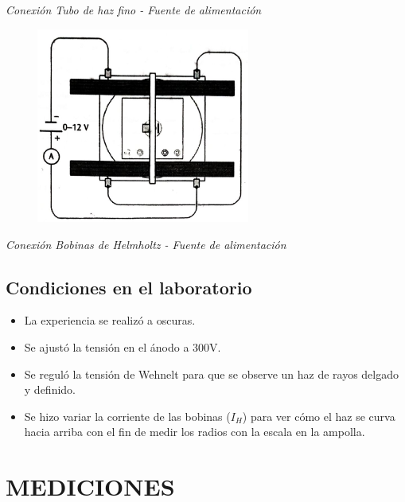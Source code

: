 \documentclass[a4paper]{article}
\begin{document}
        \begin{center}
            \textit{Conexión Tubo de haz fino - Fuente de alimentación} \\
        \end{center}

        \begin{figure}[h!]
            \centering
            \includegraphics[width = 7cm] {../imagenes/esquemaConexionBobinasHelmholtzFuenteAlim.png}
        \end{figure}

        \begin{center}
            \textit{Conexión Bobinas de Helmholtz - Fuente de alimentación}
        \end{center}

    \subsection{Condiciones en el laboratorio}
        \begin{itemize}
            \item La experiencia se realizó a oscuras. 
            \item Se ajustó la tensión en el ánodo a 300V.
            \item Se reguló la tensión de Wehnelt para que se observe un haz de rayos delgado y definido.
            \item Se hizo variar la corriente de las bobinas ($I_H$) para ver cómo el haz se curva hacia arriba con el fin de medir los radios con la escala en la ampolla.
        \end{itemize}

\section{MEDICIONES}
\end{document}
